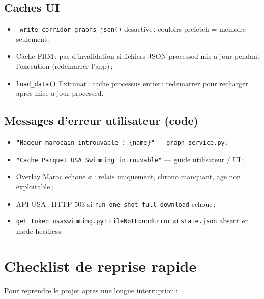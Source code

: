 \documentclass[11pt,a4paper]{article}
\begin{document}
\subsection{Caches UI}

\begin{itemize}
  \item \texttt{\_write\_corridor\_graphs\_json()} desactive\,: couloirs prefetch = memoire seulement\,;
  \item Cache FRM\,: pas d'invalidation si fichiers JSON processed mis a jour pendant l'execution (redemarrer l'app)\,;
  \item \texttt{load\_data()} Extranat\,: cache processus entier\,: redemarrer pour recharger apres mise a jour processed.
\end{itemize}

\subsection{Messages d'erreur utilisateur (code)}

\begin{itemize}
  \item \texttt{"Nageur marocain introuvable : \{name\}"} --- \texttt{graph\_service.py}\,;
  \item \texttt{"Cache Parquet USA Swimming introuvable"} --- guide utilisateur / UI\,;
  \item Overlay Maroc echoue si\,: relais uniquement, chrono manquant, age non exploitable\,;
  \item API USA\,: HTTP 503 si \texttt{run\_one\_shot\_full\_download} echoue\,;
  \item \texttt{get\_token\_usaswimming.py}\,: \texttt{FileNotFoundError} si \texttt{state.json} absent en mode headless.
\end{itemize}

\section{Checklist de reprise rapide}

Pour reprendre le projet apres une longue interruption\,:
\end{document}
